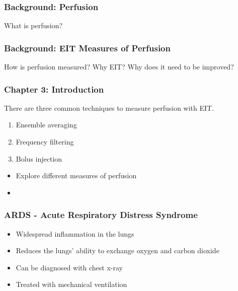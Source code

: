 \documentclass[10pt,    %
    english,            %
    xcolor=table,       %
    envcountsect,        %
    aspectratio=1610
]{beamer}
\begin{document}
\begin{frame}
	\frametitle{Background: Perfusion}
	What is perfusion?
\end{frame}

\begin{frame}
	\frametitle{Background: EIT Measures of Perfusion}
	How is perfusion measured? 
	Why EIT? 
	Why does it need to be improved?
\end{frame}

\begin{frame}
	\frametitle{Chapter 3: Introduction}
	There are \alert{three common techniques} to measure perfusion with EIT. 
	\begin{enumerate}
		\item Ensemble averaging
		\item Frequency filtering
		\item Bolus injection 
	\end{enumerate}
	\begin{itemize}
		\item Explore different measures of perfusion
		\item 
	\end{itemize}

\end{frame}


\begin{frame}
\frametitle{ARDS - Acute Respiratory Distress Syndrome}    
\begin{itemize}
	\item Widespread inflammation in the lungs 
	\item Reduces the lungs’ ability to exchange oxygen and carbon dioxide
	\item Can be diagnosed with chest x-ray 
	\item Treated with mechanical ventilation
\end{itemize}
\end{frame}
\end{document}
